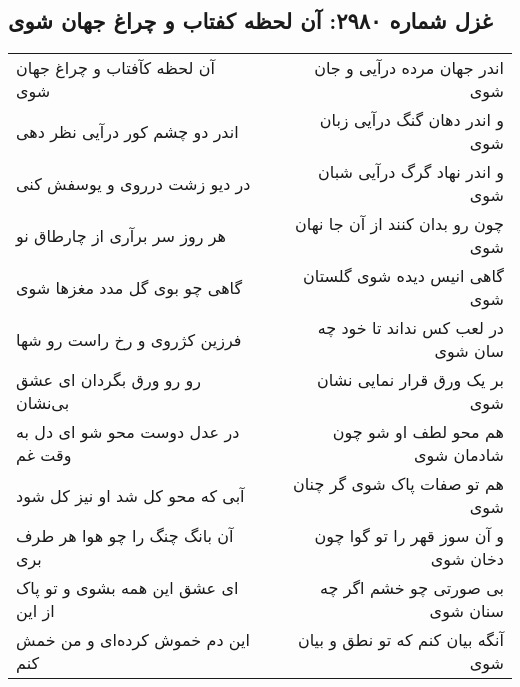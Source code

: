 \begin{center}
\section*{غزل شماره ۲۹۸۰: آن لحظه کفتاب و چراغ جهان شوی}
\label{sec:2980}
\begin{longtable}{l p{0.5cm} r}
آن لحظه کآفتاب و چراغ جهان شوی
&&
اندر جهان مرده درآیی و جان شوی
\\
اندر دو چشم کور درآیی نظر دهی
&&
و اندر دهان گنگ درآیی زبان شوی
\\
در دیو زشت درروی و یوسفش کنی
&&
و اندر نهاد گرگ درآیی شبان شوی
\\
هر روز سر برآری از چارطاق نو
&&
چون رو بدان کنند از آن جا نهان شوی
\\
گاهی چو بوی گل مدد مغزها شوی
&&
گاهی انیس دیده شوی گلستان شوی
\\
فرزین کژروی و رخ راست رو شها
&&
در لعب کس نداند تا خود چه سان شوی
\\
رو رو ورق بگردان ای عشق بی‌نشان
&&
بر یک ورق قرار نمایی نشان شوی
\\
در عدل دوست محو شو ای دل به وقت غم
&&
هم محو لطف او شو چون شادمان شوی
\\
آبی که محو کل شد او نیز کل شود
&&
هم تو صفات پاک شوی گر چنان شوی
\\
آن بانگ چنگ را چو هوا هر طرف بری
&&
و آن سوز قهر را تو گوا چون دخان شوی
\\
ای عشق این همه بشوی و تو پاک از این
&&
بی صورتی چو خشم اگر چه سنان شوی
\\
این دم خموش کرده‌ای و من خمش کنم
&&
آنگه بیان کنم که تو نطق و بیان شوی
\\
\end{longtable}
\end{center}
